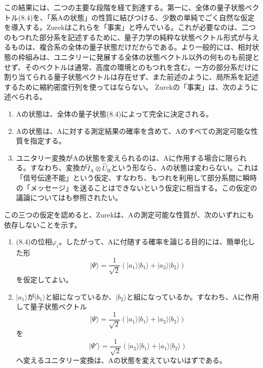 この結果には、二つの主要な段階を経て到達する。第一に、全体の量子状態ベクトル(8.4)を、「系Aの状態」の性質に結びつける、少数の単純でごく自然な仮定を導入する。Zurek\cite{ref067}はこれらを「事実」と呼んでいる。これが必要なのは、二つのもつれた部分系を記述するために、量子力学の純粋な状態ベクトル形式が与えるものは、複合系の全体の量子状態だけだからである。より一般的には、相対状態の枠組みは、ユニタリーに発展する全体の状態ベクトル以外の何ものも前提とせず、そのベクトルは通常、高度の環境とのもつれを含む。一方の部分系だけに割り当てられる量子状態ベクトルは存在せず、また前述のように、局所系を記述するために縮約密度行列を使ってはならない。
\hypertarget{srcpage:342}{}\label{srcpage:342}
Zurekの「事実」は、次のように述べられる\cite{ref067}。
\begin{enumerate}
\item[(i)] Aの状態は、全体の量子状態(8.4)によって完全に決定される。
\item[(ii)] Aの状態は、Aに対する測定結果の確率を含めて、Aのすべての測定可能な性質を指定する。
\item[(iii)] ユニタリー変換がAの状態を変えられるのは、Aに作用する場合に限られる。すなわち、変換が$\hat I_{\mathrm A}\otimes\hat U_{\mathrm B}$という形なら、Aの状態は変わらない。これは「信号伝達不能」という仮定、すなわち、もつれを利用して部分系間に瞬時の「メッセージ」を送ることはできないという仮定に相当する。この仮定の議論については\cite{ref424,ref425}も参照されたい。
\end{enumerate}
この三つの仮定を認めると、Zurekは、Aの測定可能な性質が、次のいずれにも依存しないことを示す。
\begin{enumerate}
\item[(1)] (8.4)の位相$\varphi_i$。したがって、Aに付随する確率を論じる目的には、簡単化した形
\begin{equation}
|\Psi\rangle=\frac1{\sqrt2}(|a_1\rangle|b_1\rangle+|a_2\rangle|b_2\rangle)\tag{8.5}
\end{equation}
を仮定してよい。
\item[(2)] $|a_1\rangle$が$|b_1\rangle$と組になっているか、$|b_2\rangle$と組になっているか。すなわち、Aに作用して量子状態ベクトル
\begin{equation}
|\Psi\rangle=\frac1{\sqrt2}(|a_1\rangle|b_1\rangle+|a_2\rangle|b_2\rangle)\tag{8.6}
\end{equation}
を
\begin{equation}
|\Psi'\rangle=\frac1{\sqrt2}(|a_2\rangle|b_1\rangle+|a_1\rangle|b_2\rangle)\tag{8.7}
\end{equation}
へ変えるユニタリー変換は、Aの状態を変えていないはずである。
\end{enumerate}
